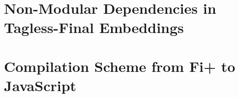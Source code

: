 \chapter{Non-Modular Dependencies in Tagless-Final Embeddings} \label{sec:tagless}


\chapter{Compilation Scheme from Fi+ to JavaScript}
